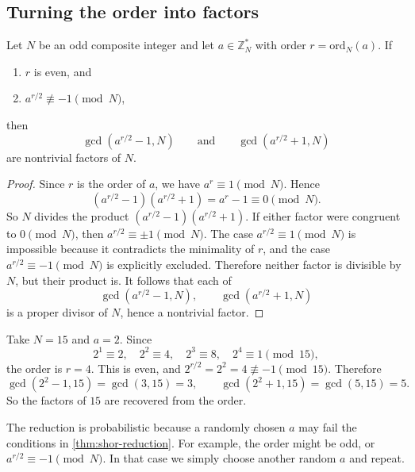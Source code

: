\subsection{Turning the order into factors}

\begin{theorem}
\label{thm:shor-reduction}
Let $N$ be an odd composite integer and let $a \in \mathbb{Z}_N^*$ with order $r=\mathrm{ord}_N(a)$. If
\begin{enumerate}
    \item $r$ is even, and
    \item $a^{r/2} \not\equiv -1 \pmod N$,
\end{enumerate}
then
\[
    \gcd(a^{r/2}-1,N)
    \qquad\text{and}\qquad
    \gcd(a^{r/2}+1,N)
\]
are nontrivial factors of $N$.
\end{theorem}

\begin{proof}
Since $r$ is the order of $a$, we have $a^r \equiv 1 \pmod N$. Hence
\[
    (a^{r/2}-1)(a^{r/2}+1) = a^r - 1 \equiv 0 \pmod N.
\]
So $N$ divides the product $(a^{r/2}-1)(a^{r/2}+1)$. If either factor were congruent to $0 \pmod N$, then $a^{r/2} \equiv \pm 1 \pmod N$. The case $a^{r/2} \equiv 1 \pmod N$ is impossible because it contradicts the minimality of $r$, and the case $a^{r/2} \equiv -1 \pmod N$ is explicitly excluded. Therefore neither factor is divisible by $N$, but their product is. It follows that each of
\[
    \gcd(a^{r/2}-1,N), \qquad \gcd(a^{r/2}+1,N)
\]
is a proper divisor of $N$, hence a nontrivial factor.
\end{proof}

\begin{example}
Take $N=15$ and $a=2$. Since
\[
    2^1 \equiv 2,\quad 2^2 \equiv 4,\quad 2^3 \equiv 8,\quad 2^4 \equiv 1 \pmod{15},
\]
the order is $r=4$. This is even, and $2^{r/2} = 2^2 = 4 \not\equiv -1 \pmod{15}$. Therefore
\[
    \gcd(2^2-1,15)=\gcd(3,15)=3,
    \qquad
    \gcd(2^2+1,15)=\gcd(5,15)=5.
\]
So the factors of $15$ are recovered from the order.
\end{example}

\begin{remark}
The reduction is probabilistic because a randomly chosen $a$ may fail the conditions in \cref{thm:shor-reduction}. For example, the order might be odd, or $a^{r/2} \equiv -1 \pmod N$. In that case we simply choose another random $a$ and repeat.
\end{remark}

